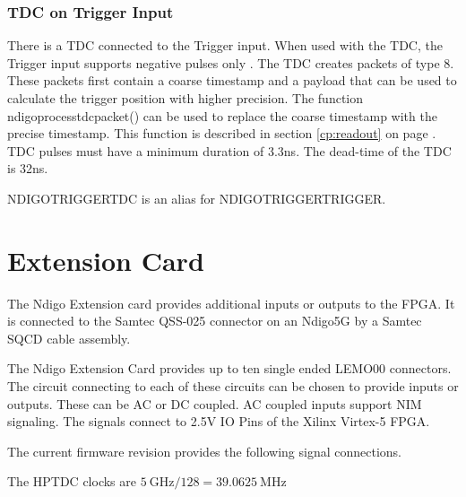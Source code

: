 \subsubsection{TDC on Trigger Input}
%
There is a TDC connected to the Trigger input. When used with the TDC, the Trigger input supports negative pulses only . The TDC creates packets of type 8. These packets first contain a coarse timestamp and a payload that can be used to calculate the trigger position with higher precision. The function \textsf{ndigo\tu process\tu tdc\tu packet()} can be used to replace the coarse timestamp with the precise timestamp. This function is described in section \ref{cp:readout} on page \pageref{cp:readout}.
TDC pulses must have a minimum duration of 3.3ns. The dead-time of the TDC is 32ns.

\textsf{NDIGO\tu TRIGGER\tu TDC} is an alias for \textsf{NDIGO\tu TRIGGER\tu TRIGGER}.
%
%
%
%
%
\section{Extension Card\label{cp:extcard}}

The Ndigo Extension card provides additional inputs or outputs to the FPGA. It is connected to the Samtec QSS-025 connector on an Ndigo5G by a Samtec SQCD cable assembly.\par
The Ndigo Extension Card provides up to ten single ended LEMO00 connectors. The circuit connecting to each of these circuits can be chosen to provide inputs or outputs. These can be AC or DC coupled. AC coupled inputs support NIM signaling. The signals connect to 2.5V IO Pins of the Xilinx Virtex-5 FPGA.

The current firmware revision provides the following signal connections.

The HPTDC clocks are $\SI{5}{\giga\hertz} / 128 = \SI{39.0625}{\mega\hertz}$\par

